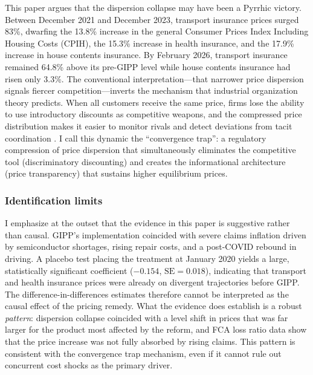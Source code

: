 \documentclass[12pt]{article}
\begin{document}
This paper argues that the dispersion collapse may have been a Pyrrhic victory. Between December 2021 and December 2023, transport insurance prices surged 83\%, dwarfing the 13.8\% increase in the general Consumer Prices Index Including Housing Costs (CPIH), the 15.3\% increase in health insurance, and the 17.9\% increase in house contents insurance. By February 2026, transport insurance remained 64.8\% above its pre-GIPP level while house contents insurance had risen only 3.3\%. The conventional interpretation---that narrower price dispersion signals fiercer competition---inverts the mechanism that industrial organization theory predicts. When all customers receive the same price, firms lose the ability to use introductory discounts as competitive weapons, and the compressed price distribution makes it easier to monitor rivals and detect deviations from tacit coordination \citep{stigler1964theory}. I call this dynamic the ``convergence trap'': a regulatory compression of price dispersion that simultaneously eliminates the competitive tool (discriminatory discounting) and creates the informational architecture (price transparency) that sustains higher equilibrium prices.

\subsubsection*{Identification limits} I emphasize at the outset that the evidence in this paper is suggestive rather than causal. GIPP's implementation coincided with severe claims inflation driven by semiconductor shortages, rising repair costs, and a post-COVID rebound in driving. A placebo test placing the treatment at January 2020 yields a large, statistically significant coefficient ($-0.154$, $\text{SE} = 0.018$), indicating that transport and health insurance prices were already on divergent trajectories before GIPP. The difference-in-differences estimates therefore cannot be interpreted as the causal effect of the pricing remedy. What the evidence does establish is a robust \textit{pattern}: dispersion collapse coincided with a level shift in prices that was far larger for the product most affected by the reform, and FCA loss ratio data show that the price increase was not fully absorbed by rising claims. This pattern is consistent with the convergence trap mechanism, even if it cannot rule out concurrent cost shocks as the primary driver.
\end{document}
